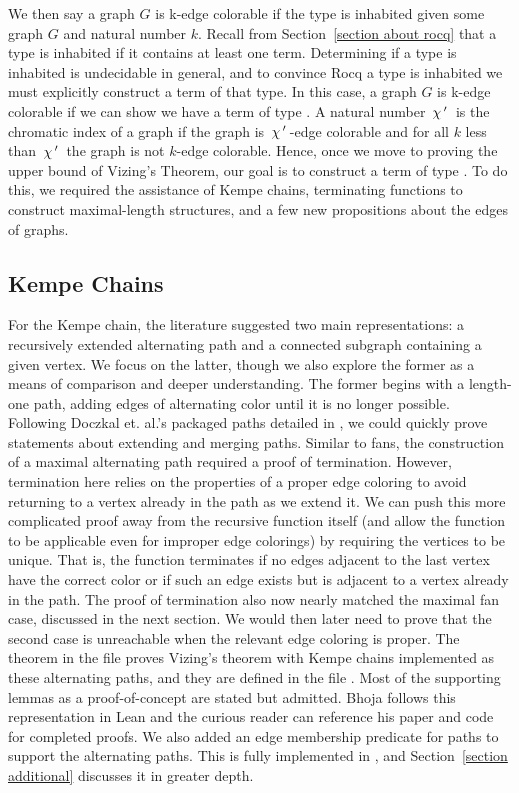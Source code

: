 We then say a graph $G$ is k-edge colorable if the type  is inhabited given some graph $G$ and natural number $k$. Recall from Section~\ref{section about rocq} that a type is inhabited if it contains at least one term. Determining if a type is inhabited is undecidable in general, and to convince Rocq a type is inhabited we must explicitly construct a term of that type. In this case, a graph $G$ is k-edge colorable if we can show we have a term of type . A natural number $\,\chi\,'\,$ is the chromatic index of a graph if the graph is $\,\chi\,'\,$-edge colorable and for all $k$ less than $\,\chi\,'\,$ the graph is not $k$-edge colorable. Hence, once we move to proving the upper bound of Vizing's Theorem, our goal is to construct a term of type . To do this, we required the assistance of Kempe chains, terminating functions to construct maximal-length structures, and a few new propositions about the edges of graphs.

\subsection{Kempe Chains}\label{section Kempe implement}
For the Kempe chain, the literature suggested two main representations: a recursively extended alternating path and a connected subgraph containing a given vertex. We focus on the latter, though we also explore the former as a means of comparison and deeper understanding. The former begins with a length-one path, adding edges of alternating color until it is no longer possible. Following Doczkal et. al.’s packaged paths detailed in \cite{Doczkal}, we could quickly prove statements about extending and merging paths. Similar to fans, the construction of a maximal alternating path required a proof of termination. However, termination here relies on the properties of a proper edge coloring to avoid returning to a vertex already in the path as we extend it. We can push this more complicated proof away from the recursive function itself (and allow the function to be applicable even for improper edge colorings) by requiring the vertices to be unique. That is, the function terminates if no edges adjacent to the last vertex have the correct color or if such an edge exists but is adjacent to a vertex already in the path. The proof of termination also now nearly matched the maximal fan case, discussed in the next section. We would then later need to prove that the second case is unreachable when the relevant edge coloring is proper. The theorem  in the file  proves Vizing's theorem with Kempe chains implemented as these alternating paths, and they are defined in the file . Most of the supporting lemmas as a proof-of-concept are stated but admitted. Bhoja follows this representation in Lean and the curious reader can reference his paper \cite{Bhoja} and code \cite{bhojaCode} for completed proofs. We also added an edge membership predicate for paths to support the alternating paths. This is fully implemented in , and Section~\ref{section additional} discusses it in greater depth. 

